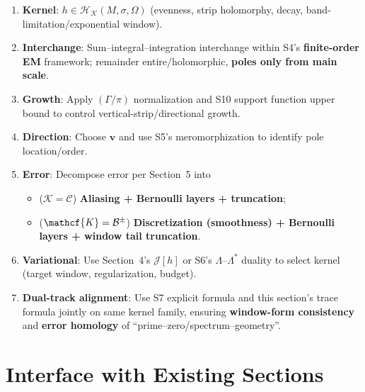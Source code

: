 \documentclass[11pt,a4paper]{article}
\theoremstyle{remark}
\begin{document}
\begin{enumerate}
\item \textbf{Kernel}: $h\in\mathscr{H}_{\mathcal{K}}(M,\sigma,\Omega)$ (evenness, strip holomorphy, decay, band-limitation/exponential window).

\item \textbf{Interchange}: Sum--integral--integration interchange within S4's \textbf{finite-order EM} framework; remainder entire/holomorphic, \textbf{poles only from main scale}.

\item \textbf{Growth}: Apply $(\Gamma/\pi)$ normalization and S10 support function upper bound to control vertical-strip/directional growth.

\item \textbf{Direction}: Choose $\mathbf{v}$ and use S5's meromorphization to identify pole location/order.

\item \textbf{Error}: Decompose error per Section~5 into
\begin{itemize}
\item ($\mathcal{K}=\mathcal{C}$) \textbf{Aliasing + Bernoulli layers + truncation};
\item ($\mathcf{K}=\mathcal{B}^\pm$) \textbf{Discretization (smoothness) + Bernoulli layers + window tail truncation}.
\end{itemize}

\item \textbf{Variational}: Use Section~4's $\mathcal{J}[h]$ or S6's $\Lambda$--$\Lambda^\ast$ duality to select kernel (target window, regularization, budget).

\item \textbf{Dual-track alignment}: Use S7 explicit formula and this section's trace formula jointly on same kernel family, ensuring \textbf{window-form consistency} and \textbf{error homology} of ``prime--zero/spectrum--geometry''.
\end{enumerate}

\section{Interface with Existing Sections}
\end{document}
